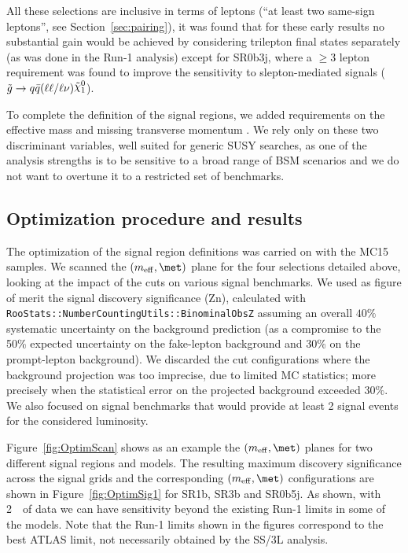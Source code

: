 All these selections are inclusive in terms of leptons (``at least two same-sign leptons'', see Section~\ref{sec:pairing}), 
it was found that for these early results no substantial gain would be achieved by considering trilepton final states separately (as was done in the Run-1 analysis) except for SR0b3j, where a $\geq$3 lepton requirement was found to improve the sensitivity to slepton-mediated signals ($\gluino\to q\bar{q}(\ell\ell/\ell\nu)\ninoone$).

To complete the definition of the signal regions, we added requirements on the effective mass \meff{} and missing transverse momentum \met. 
We rely only on these two discriminant variables, well suited for generic SUSY searches, 
as one of the analysis strengths is to be sensitive to a broad range of BSM scenarios and we do not want to overtune it to a restricted set of benchmarks. 

\subsection{Optimization procedure and results}

The optimization of the signal region definitions was carried on with the MC15 samples. %
We scanned the $(\meff,\met)$ plane for the four selections detailed above, 
looking at the impact of the cuts on various signal benchmarks. 
We used as figure of merit the signal discovery significance (Zn), calculated with {\tt RooStats::NumberCountingUtils::BinominalObsZ} 
assuming an overall $40\%$ systematic uncertainty on the background prediction (as a compromise to the 50\% expected uncertainty on the fake-lepton background and 30\% on the prompt-lepton background). 
We discarded the cut configurations where the background projection was too imprecise, due to limited MC statistics; 
more precisely when the statistical error on the projected background exceeded $30\%$. 
We also focused on signal benchmarks that would provide at least 2 signal events for the considered luminosity. 

Figure~\ref{fig:OptimScan} shows as an example the $(\meff, \met)$ planes for two different signal regions and models.
The resulting maximum discovery significance across the signal grids and the corresponding $(\meff,\met)$ configurations 
are shown in Figure~\ref{fig:OptimSig1} for SR1b, SR3b and SR0b5j. As shown, with 2~\ifb\ of data we can have sensitivity beyond the existing Run-1 limits in some of the models. Note that the Run-1 limits shown in the figures correspond to the best ATLAS limit, not necessarily obtained by the SS/3L analysis.


